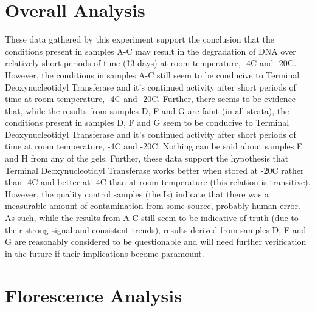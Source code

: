 \documentclass[a4paper,xcolor=table]{article}
\newcommand{\tdt}{Terminal Deoxynucleotidyl Transferase}
\newcommand{\C}{\degree C}
\begin{document}
\section{Overall Analysis}

These data gathered by this experiment support the conclusion that the conditions present in samples A-C may result in the degradation of DNA over relatively short periods of time (\~13 days) at room temperature, -4\C{} and -20\C{}. However, the conditions in samples A-C still seem to be conducive to \tdt{} and it's continued activity after short periods of time at room temperature, -4\C{} and -20\C{}. Further, there seems to be evidence that, while the results from samples D, F and G are faint (in all strata), the conditions present in samples D, F and G seem to be conducive to \tdt{} and it's continued activity after short periods of time at room temperature, -4\C{} and -20\C{}. Nothing can be said about samples E and H from any of the gels. Further, these data support the hypothesis that \tdt{} works better when stored at -20\C{} rather than -4\C{} and better at -4\C{} than at room temperature (this relation is transitive). However, the quality control samples (the Is) indicate that there was a measurable amount of contamination from some source, probably human error. As such, while the results from A-C still seem to be indicative of truth (due to their strong signal and consistent trends), results derived from samples D, F and G are reasonably considered to be questionable and will need further verification in the future if their implications become paramount.

\section{Florescence Analysis}
\end{document}
